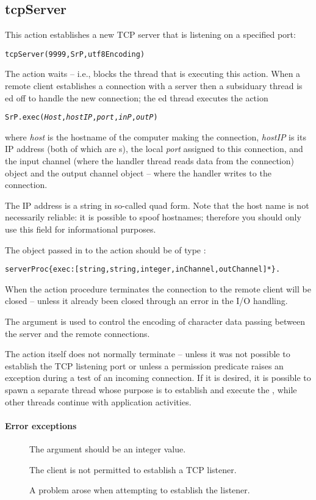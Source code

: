 \subsection{tcpServer}
\label{io:tcp-server}
This action establishes a new TCP server that is listening on a specified port:
\begin{alltt}
tcpServer(9999,SrP,utf8Encoding)
\end{alltt}
The  action waits -- i.e., blocks the \go thread that is executing this action. When a remote client establishes a connection with a \go server then a subsiduary \go thread is ed off to handle the new connection; the ed thread executes the action
\begin{alltt}
SrP.exec(\emph{Host},\emph{hostIP},\emph{port},\emph{inP},\emph{outP})
\end{alltt}
where \emph{host} is the hostname of the computer making the connection, \emph{hostIP} is its IP address (both of which are s), the local \emph{port} assigned to this connection, and the input channel (where the handler thread reads data from the connection) object  and the output channel object -- where the handler writes to the connection.

The IP address is a string in so-called quad form. Note that the host name is not necessarily reliable: it is possible to spoof hostnames; therefore you should only use this field for informational purposes. 

The object  passed in to the  action should be of type :
\begin{alltt}
serverProc \impl \{ exec:[string,string,integer,inChannel,outChannel]* \}.
\end{alltt}
When the  action procedure terminates the connection to the remote client will be closed -- unless it already been closed through an error in the I/O handling. 

The  argument is used to control the encoding of character data passing between the server and the remote connections. 

The  action itself does not normally terminate -- unless it was not possible to establish the TCP listening port or unless a permission predicate raises an exception during a test of an incoming connection. If it is desired, it is possible to spawn a separate thread whose purpose is to establish and execute the , while other threads continue with application activities.
\paragraph{Error exceptions}
\begin{description}
\item[]
The  argument should be an integer value.
\item[]
The client is not permitted to establish a TCP listener.
\item[]
A problem arose when attempting to establish the listener.
\end{description}
